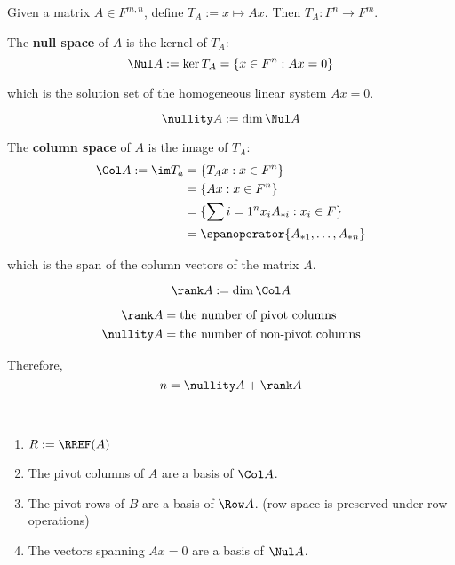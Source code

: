 Given a matrix $A \in F^{m,n}$, define $T_A := x \mapsto Ax$. Then $T_A : F^n \to F^m$.

\begin{definition}
  The \textbf{null space} of $A$ is the kernel of $T_A$:
  \[
    \Nul A := \ker T_A = \{x \in F^n : Ax = 0\}
  \]

  which is the solution set of the homogeneous linear system $Ax = 0$. 

  \[
    \nullity A := \dim \Nul A
  \]
\end{definition}

\begin{definition}
  The \textbf{column space} of $A$ is the image of $T_A$:
  \begin{align*}
    \Col A := \im T_a 
    &= \{T_A x : x \in F^n \} \\
    &= \{Ax : x \in F^n \} \\
    &= \{ \sum{i = 1}^n x_i A_{*i} : x_i \in F \} \\
    &= \spanoperator \{ A_{*1}, \ldots, A_{*n} \}
  \end{align*}

  which is the span of the column vectors of the matrix $A$.

  \[
    \rank A := \dim \Col A
  \]
\end{definition}

\begin{lemma}
  \begin{align*}
    \rank A &= \text{the number of pivot columns} \\
    \nullity A &= \text{the number of non-pivot columns}
  \end{align*}
  
  Therefore,
  \[
    n = \nullity A + \rank A
  \]
\end{lemma}

\begin{procedure} \ \\
  \begin{enumerate}
    \item $R := \RREF(A)$
    \item The pivot columns of $A$ are a basis of $\Col A$.
    \item The pivot rows of $B$ are a basis of $\Row A$. (row space is preserved under row operations)
    \item The vectors spanning $Ax = 0$ are a basis of $\Nul A$.
  \end{enumerate}
\end{procedure}

